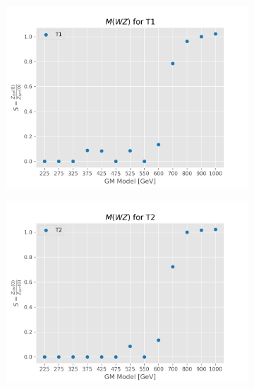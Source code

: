 \documentclass[../Bachelorarbeit.tex]{subfiles}
\begin{document}
\begin{figure}[h]
\begin{subfigure}{0.45\textwidth}
        \includegraphics[width=\textwidth]{Plots/gm_relevanze/MWZ_op_T1.png}
        \caption{}
    \end{subfigure}
    \begin{subfigure}{0.45\textwidth}
        \includegraphics[width=\textwidth]{Plots/gm_relevanze/MWZ_op_T2.png}
        \caption{}
    \end{subfigure}
    \caption{}
\end{figure}
\end{document}
